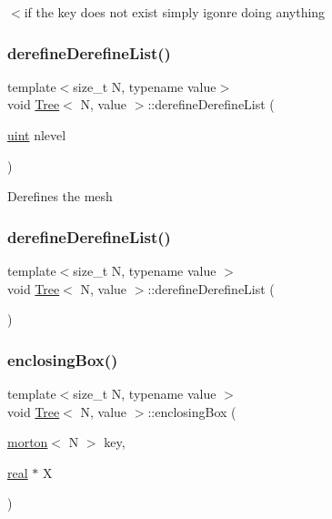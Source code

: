 $<$if the key does not exist simply igonre doing anything \mbox{\label{classTree_a09d2a574f82bfd4e8f7974a6a3fda540}} 
\subsubsection{\texorpdfstring{derefine\+Derefine\+List()}{derefineDerefineList()}\hspace{0.1cm}{\footnotesize\ttfamily [1/2]}}
{\footnotesize\ttfamily template$<$size\+\_\+t N, typename value$>$ \\
void \mbox{\hyperlink{classTree}{Tree}}$<$ N, value $>$\+::derefine\+Derefine\+List (\begin{DoxyParamCaption}\item[{\mbox{\hyperlink{definitions_8h_a69aa29b598b851b0640aa225a9e5d61d}{uint}}}]{nlevel }\end{DoxyParamCaption})}

Derefines the mesh \mbox{\label{classTree_ac151fd0d1ed04e995d03d3cc6b5f7237}} 
\subsubsection{\texorpdfstring{derefine\+Derefine\+List()}{derefineDerefineList()}\hspace{0.1cm}{\footnotesize\ttfamily [2/2]}}
{\footnotesize\ttfamily template$<$size\+\_\+t N, typename value $>$ \\
void \mbox{\hyperlink{classTree}{Tree}}$<$ N, value $>$\+::derefine\+Derefine\+List (\begin{DoxyParamCaption}{ }\end{DoxyParamCaption})}

\mbox{\label{classTree_a9be1d9b3344d8c7300bc600e4d959ef1}} 
\subsubsection{\texorpdfstring{enclosing\+Box()}{enclosingBox()}}
{\footnotesize\ttfamily template$<$size\+\_\+t N, typename value $>$ \\
void \mbox{\hyperlink{classTree}{Tree}}$<$ N, value $>$\+::enclosing\+Box (\begin{DoxyParamCaption}\item[{\mbox{\hyperlink{definitions_8h_af8682350bd8bb38ee9023f7a0a310add}{morton}}$<$ N $>$}]{key,  }\item[{\mbox{\hyperlink{definitions_8h_aedc0ad84d1e764530814f57ad931d02a}{real}} $\ast$}]{X }\end{DoxyParamCaption})}

